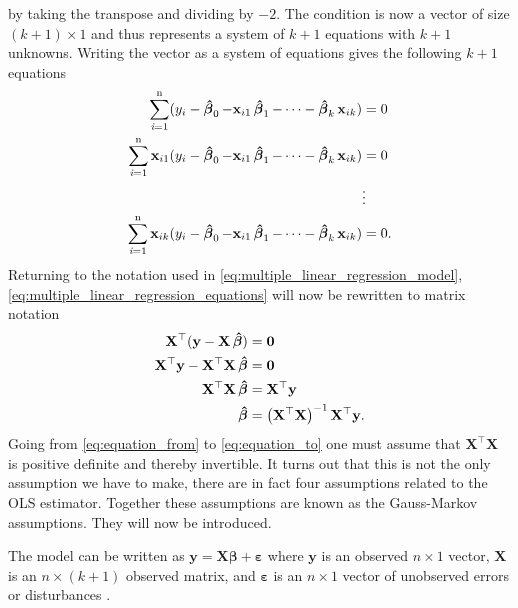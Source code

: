 by taking the transpose and dividing by $-2$.
The condition is now a vector of size $(k + 1) \times 1$ and thus represents a system of $k + 1$ equations with $k + 1$ unknowns.
Writing the vector as a system of equations gives the following $k + 1$ equations
\begin{align}\label{eq:multiple_linear_regression_equations}
\begin{split}
    \operatorname{\sum_{\textit{i}=1}^n} (y_i - \operatorname{\boldsymbol{\hat{\beta}}}_0 -  \mathbf{x}_{i1} \operatorname{\boldsymbol{\hat{\beta}}}_1 - \cdots - \operatorname{\boldsymbol{\hat{\beta}}}_k \mathbf{x}_{ik}) &= 0 \\
    \operatorname{\sum_{\textit{i}=1}^n} \mathbf{x}_{i1}(y_i - \operatorname{\boldsymbol{\hat{\beta}}}_0 -  \mathbf{x}_{i1} \operatorname{\boldsymbol{\hat{\beta}}}_1 - \cdots - \operatorname{\boldsymbol{\hat{\beta}}}_k \mathbf{x}_{ik}) &= 0 \\
    &\vdots \\
    \operatorname{\sum_{\textit{i}=1}^n} \mathbf{x}_{ik}(y_i - \operatorname{\boldsymbol{\hat{\beta}}}_0 -  \mathbf{x}_{i1} \operatorname{\boldsymbol{\hat{\beta}}}_1 - \cdots - \operatorname{\boldsymbol{\hat{\beta}}}_k \mathbf{x}_{ik}) &= 0.
\end{split}
\end{align}
Returning to the notation used in \eqref{eq:multiple_linear_regression_model}, \eqref{eq:multiple_linear_regression_equations} will now be rewritten to matrix notation
\begin{align}\label{eq:equation_to}
    \mathbf{X}^\top(\mathbf{y} - \mathbf{X}\operatorname{\boldsymbol{\hat{\beta}}}) &= \mathbf{0} \nonumber\\
    \mathbf{X}^\top\mathbf{y} - \mathbf{X}^\top\mathbf{X}\operatorname{\boldsymbol{\hat{\beta}}} &= \mathbf{0}\nonumber\\
    \mathbf{X}^\top\mathbf{X}\operatorname{\boldsymbol{\hat{\beta}}} &= \mathbf{X}^\top\mathbf{y}\label{eq:equation_from} \\
    \operatorname{\boldsymbol{\hat{\beta}}} &= \left(\mathbf{X}^\top\mathbf{X}\right)^{-1}\mathbf{X}^\top\mathbf{y}.
\end{align}
Going from \eqref{eq:equation_from} to \eqref{eq:equation_to} one must assume that $\mathbf{X}^\top\mathbf{X}$ is positive definite and thereby invertible.
It turns out that this is not the only assumption we have to make, there are in fact four assumptions related to the OLS estimator.
Together these assumptions are known as the Gauss-Markov assumptions. 
They will now be introduced.
\begin{assumption}\label{as:linear_in_the_parameters}
    The model can be written as $\mathbf{y} = \mathbf{X}\boldsymbol{\beta} + \boldsymbol{\varepsilon}$ where $\mathbf{y}$ is an observed $n \times 1$ vector, $\mathbf{X}$ is an $n \times (k + 1)$ observed matrix, and $\boldsymbol{\varepsilon}$ is an $n \times 1$ vector of unobserved errors or disturbances \cite[p. 809]{Wooldridge2012}.
\end{assumption}
